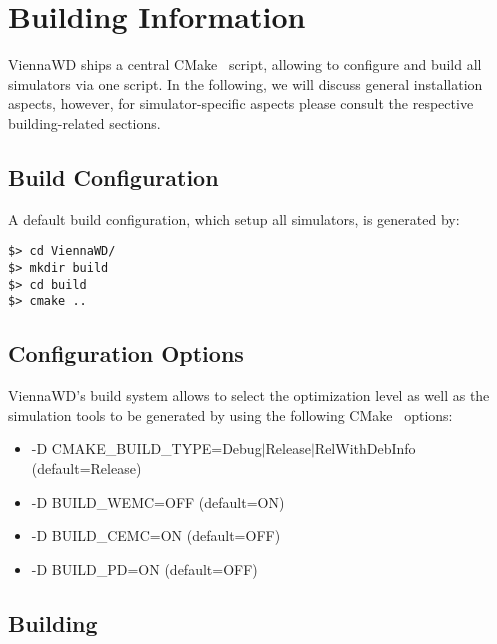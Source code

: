 \documentclass[11pt]{report}
\begin{document}
\chapter{Building Information}

ViennaWD ships a central CMake~\cite{cmake} script, allowing to configure and build all simulators via one script.
In the following, we will discuss general installation aspects, however, for simulator-specific aspects please consult the respective
building-related sections.

\section{Build Configuration}

A default build configuration, which setup all simulators, is generated by:


\begin{lstlisting}
$> cd ViennaWD/
$> mkdir build
$> cd build
$> cmake ..
\end{lstlisting}





\section{Configuration Options}

ViennaWD's build system allows to select the optimization level as well as the simulation tools to be generated by using the following CMake~\cite{cmake} options:

\begin{itemize}
  \item -D CMAKE\_BUILD\_TYPE=Debug$|$Release$|$RelWithDebInfo (default=Release)
  \item -D BUILD\_WEMC=OFF (default=ON)
  \item -D BUILD\_CEMC=ON (default=OFF)
  \item -D BUILD\_PD=ON (default=OFF)
\end{itemize}

\section{Building}
\end{document}
